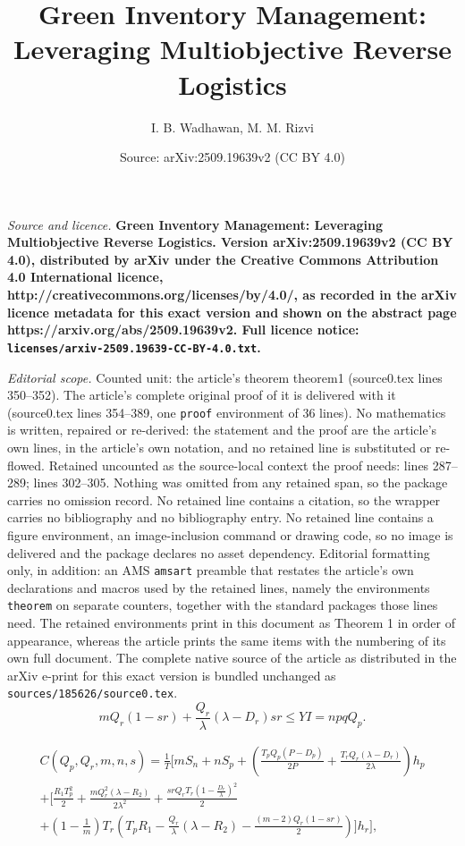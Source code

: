 \documentclass[10pt,a4paper]{amsart}
\title{\bf \Large{Green Inventory Management: Leveraging Multiobjective Reverse Logistics}}
\author{I. B. Wadhawan, M. M. Rizvi}
\date{Source: arXiv:2509.19639v2 (CC BY 4.0)}
\begin{document}
\maketitle

\noindent\emph{Source and licence.} \bf \Large{Green Inventory Management: Leveraging Multiobjective Reverse Logistics}. Version arXiv:2509.19639v2 (CC BY 4.0), distributed by arXiv under the Creative Commons Attribution 4.0 International licence, http://creativecommons.org/licenses/by/4.0/, as recorded in the arXiv licence metadata for this exact version and shown on the abstract page https://arxiv.org/abs/2509.19639v2. Full licence notice: \texttt{licenses/arxiv-2509.19639-CC-BY-4.0.txt}.\par\smallskip

\noindent\textit{Editorial scope.} Counted unit: the article's theorem theorem1 (source0.tex lines 350--352). The article's complete original proof of it is delivered with it (source0.tex lines 354--389, one \texttt{proof} environment of 36 lines). No mathematics is written, repaired or re-derived: the statement and the proof are the article's own lines, in the article's own notation, and no retained line is substituted or re-flowed.  Retained uncounted as the source-local context the proof needs: lines 287--289; lines 302--305.  Nothing was omitted from any retained span, so the package carries no omission record.  No retained line contains a citation, so the wrapper carries no bibliography and no bibliography entry.  No retained line contains a figure environment, an image-inclusion command or drawing code, so no image is delivered and the package declares no asset dependency.  Editorial formatting only, in addition: an AMS \texttt{amsart} preamble that restates the article's own declarations and macros used by the retained lines, namely the environments \texttt{theorem} on separate counters, together with the standard packages those lines need.  The retained environments print in this document as Theorem 1 in order of appearance, whereas the article prints the same items with the numbering of its own full document.  The complete native source of the article as distributed in the arXiv e-print for this exact version is bundled unchanged as \texttt{sources/185626/source0.tex}.
\begin{equation}\label{con1}
    mQ_r(1 - sr) + \frac{Q_r}{\lambda} (\lambda - D_r)sr \leq YI = npqQ_p.
\end{equation}

\begin{multline}\label{eqcost1a}
C(Q_p, Q_r, m, n, s) = \frac{1}{T}\Bigg[ mS_n+nS_p + \left(\frac{T_pQ_p(P-D_p)}{2P}+\frac{T_rQ_r(\lambda-D_r)}{2 \lambda}\right)h_p \\ +\Bigg[ \frac{R_1T_p^2}{2} + \frac{m Q_r^2(\lambda - R_2)}{2\lambda^2} +\frac{srQ_rT_r(1-\frac{D_r}{\lambda})^2}{2} \\ 
+\left(1-\frac{1}{m}\right)T_r\left(T_pR_1-\frac{Q_r}{\lambda}(\lambda - R_2)-\frac{(m-2)Q_r(1-sr)}{2}\right)\Bigg] h_r \Bigg],
\end{multline}
\end{document}
